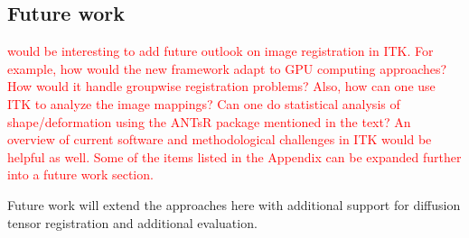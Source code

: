 \documentclass{frontiersSCNS}
\begin{document}
\subsection{Future work}

\textcolor{red}{would be interesting to add future outlook on image registration in ITK. For example, how would the new framework adapt to GPU computing approaches? How would it handle groupwise registration problems? Also, how can one use ITK to analyze the image mappings? Can one do statistical analysis of shape/deformation using the ANTsR package mentioned in the text? An overview of current software and methodological challenges in ITK would be helpful as well. Some of the items listed in the Appendix can be expanded further into a future work section. }

Future work will extend the approaches here with additional support
for diffusion tensor registration and additional evaluation.





\end{document}
